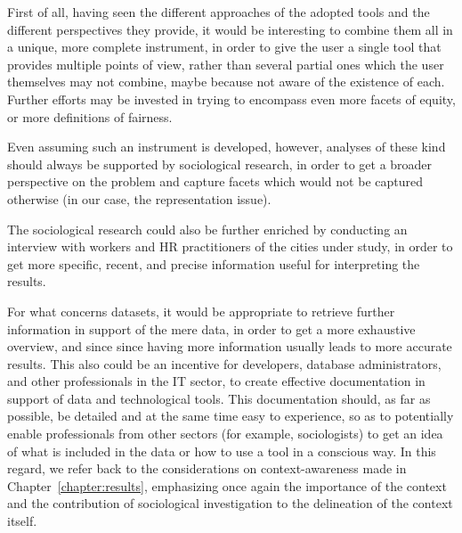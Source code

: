 First of all, having seen the different approaches of the adopted tools and the different perspectives they provide, it would be interesting to combine them all in a unique, more complete instrument, in order to give the user a single tool that provides multiple points of view, rather than several partial ones which the user themselves may not combine, maybe because not aware of the existence of each. Further efforts may be invested in trying to encompass even more facets of equity, or more definitions of fairness.

Even assuming such an instrument is developed, however, analyses of these kind should always be supported by sociological research, in order to get a broader perspective on the problem and capture facets which would not be captured otherwise (in our case, the representation issue).

The sociological research could also be further enriched by conducting an interview with workers and HR practitioners of the cities under study, in order to get more specific, recent, and precise information useful for interpreting the results.

For what concerns datasets, it would be appropriate to retrieve further information in support of the mere data, in order to get a more exhaustive overview, and since since having more information usually leads to more accurate results. This also could be an incentive for developers, database administrators, and other professionals in the IT sector, to create effective documentation in support of data and technological tools. This documentation should, as far as possible, be detailed and at the same time easy to experience, so as to potentially enable professionals from other sectors (for example, sociologists) to get an idea of what is included in the data or how to use a tool in a conscious way. In this regard, we refer back to the considerations on context-awareness made in Chapter~\ref{chapter:results}, emphasizing once again the importance of the context and the contribution of sociological investigation to the delineation of the context itself.
